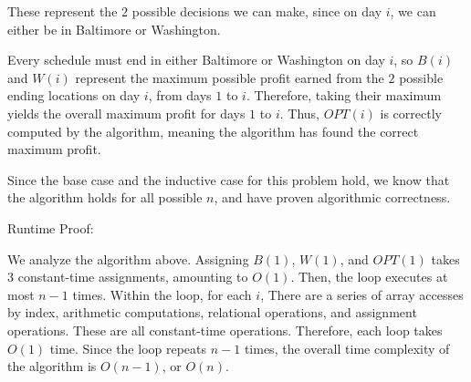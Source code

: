 \documentclass[11pt]{article}
\begin{document}
These represent the $2$ possible decisions we can make, since on day $i$, we can either be in Baltimore or Washington. 

Every schedule must end in either Baltimore or Washington on day $i$, so $B(i)$ and $W(i)$ represent the maximum possible profit earned from the 
$2$ possible ending locations on day $i$, from days $1$ to $i$. Therefore, taking their maximum yields the overall maximum profit for days $1$ to $i$. 
Thus, $OPT(i)$ is correctly computed by the algorithm, meaning the algorithm has found the correct maximum profit.

Since the base case and the inductive case for this problem hold, we know that the algorithm holds for all possible $n$, 
and have proven algorithmic correctness.

\bigbreak

Runtime Proof:

We analyze the algorithm above. Assigning $B(1)$, $W(1)$, and $OPT(1)$ takes $3$ constant-time assignments, amounting to $O(1)$. 
Then, the loop executes at most $n-1$ times. Within the loop, for each $i$, There are a series of array accesses by index, 
arithmetic computations, relational operations, and assignment operations. These are all constant-time operations. 
Therefore, each loop takes $O(1)$ time. Since the loop repeats $n-1$ times, the overall time complexity of the algorithm 
is $O(n-1)$, or $O(n)$.
\end{document}
